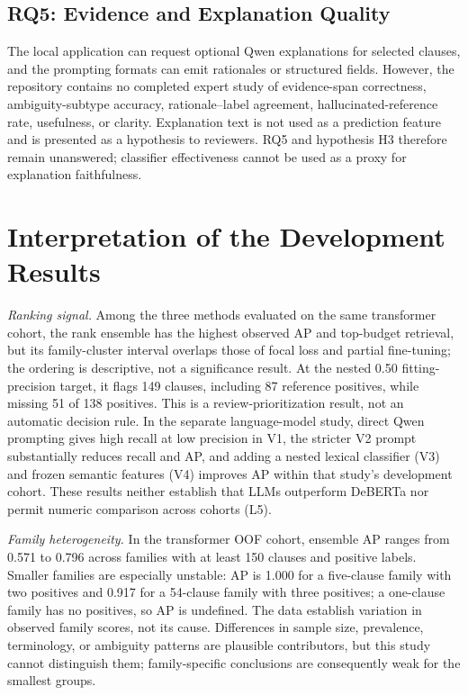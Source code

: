 \documentclass[12pt,a4paper,oneside]{report}
\begin{document}
\subsection{RQ5: Evidence and Explanation Quality}

The local application can request optional Qwen explanations for selected clauses, and the prompting formats can emit rationales or structured fields. However, the repository contains no completed expert study of evidence-span correctness, ambiguity-subtype accuracy, rationale--label agreement, hallucinated-reference rate, usefulness, or clarity. Explanation text is not used as a prediction feature and is presented as a hypothesis to reviewers. RQ5 and hypothesis H3 therefore remain unanswered; classifier effectiveness cannot be used as a proxy for explanation faithfulness.

\section{Interpretation of the Development Results}

\emph{Ranking signal.} Among the three methods evaluated on the same transformer cohort, the rank ensemble has the highest observed AP and top-budget retrieval, but its family-cluster interval overlaps those of focal loss and partial fine-tuning; the ordering is descriptive, not a significance result. At the nested 0.50 fitting-precision target, it flags 149 clauses, including 87 reference positives, while missing 51 of 138 positives. This is a review-prioritization result, not an automatic decision rule. In the separate language-model study, direct Qwen prompting gives high recall at low precision in V1, the stricter V2 prompt substantially reduces recall and AP, and adding a nested lexical classifier (V3) and frozen semantic features (V4) improves AP within that study's development cohort. These results neither establish that LLMs outperform DeBERTa nor permit numeric comparison across cohorts (L5).

\emph{Family heterogeneity.} In the transformer OOF cohort, ensemble AP ranges from 0.571 to 0.796 across families with at least 150 clauses and positive labels. Smaller families are especially unstable: AP is 1.000 for a five-clause family with two positives and 0.917 for a 54-clause family with three positives; a one-clause family has no positives, so AP is undefined. The data establish variation in observed family scores, not its cause. Differences in sample size, prevalence, terminology, or ambiguity patterns are plausible contributors, but this study cannot distinguish them; family-specific conclusions are consequently weak for the smallest groups.
\end{document}

